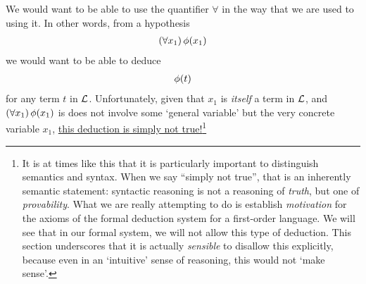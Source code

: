 We would want to be able to use the quantifier $\forall$ in the way that we are used to using it. In other words, from a hypothesis
\begin{align*}
    \left( \forall x_1 \right) \phi\!\left( x_1 \right)
\end{align*}
we would want to be able to deduce
\begin{align*}
    \phi\!\left( t \right)
\end{align*}
for any term $t$ in $\mathcal{L}$. Unfortunately, given that $x_1$ is \textit{itself} a term in $\mathcal{L}$, and $\left( \forall x_1 \right) \phi\!\left( x_1 \right)$ is does not involve some `general variable' but the very concrete variable $x_1$, \underline{this deduction is simply not true!}\footnote{It is at times like this that it is particularly important to distinguish semantics and syntax. When we say ``simply not true'', that is an inherently semantic statement: syntactic reasoning is not a reasoning of \textit{truth}, but one of \textit{provability}. What we are really attempting to do is establish \textit{motivation} for the axioms of the formal deduction system for a first-order language. We will see that in our formal system, we will not allow this type of deduction. This section underscores that it is actually \textit{sensible} to disallow this explicitly, because even in an `intuitive' sense of reasoning, this would not `make sense'.}

